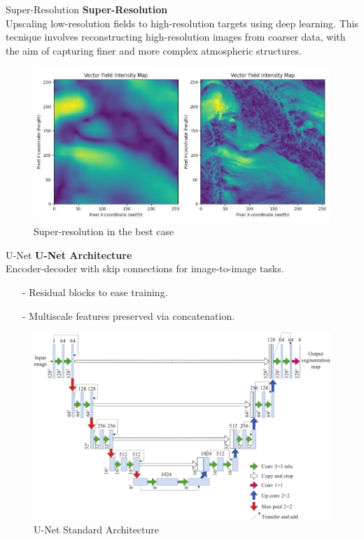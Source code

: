 \documentclass[footline=authortitle]{beamer}
\begin{document}
\begin{frame}{Super-Resolution}
\textbf{Super-Resolution}\\\justifying
Upscaling low-resolution fields to high-resolution targets using deep learning. This tecnique involves reconstructing high-resolution images from coarser data, with the aim of capturing finer and more complex atmospheric structures.
\begin{figure}
    \centering
    \includegraphics[width=0.8\linewidth]{images/img_superris.jpeg}
    \caption{Super-resolution in the best case}
    \label{fig:enter-label}
\end{figure}
\end{frame}

\begin{frame}{U-Net}
    \textbf{U-Net Architecture}\\Encoder-decoder with skip connections for image-to-image tasks.
      \begin{itemize}
        \item[-] Residual blocks to ease training.
        \item[-] Multiscale features preserved via concatenation.
      \end{itemize}
      \begin{figure}
          \centering
          \includegraphics[width=0.6\linewidth]{images/unet.jpg}
          \caption{U-Net Standard Architecture}
          \label{fig:enter-label}
      \end{figure}
\end{frame}
\end{document}
